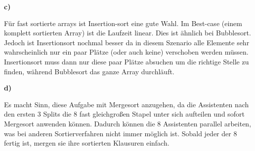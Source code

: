 \documentclass[a4paper,graphics,11pt]{article}
\begin{document}
\textbf{c)}

Für fast sortierte arrays ist Insertion-sort eine gute Wahl. Im Best-case (einem komplett sortierten Array)
ist die Laufzeit linear. Dies ist ähnlich bei Bubblesort. Jedoch ist Insertionsort nochmal besser da
in diesem Szenario alle Elemente sehr wahrscheinlich nur ein paar Plätze (oder auch keine) verschoben werden
müssen. Insertionsort muss dann nur diese paar Plätze absuchen um die richtige Stelle zu finden, während Bubblesort
das ganze Array durchläuft.

\textbf{d)}

Es macht Sinn, diese Aufgabe mit Mergesort anzugehen, da die Assistenten nach den ersten 3 Splits die 8 fast gleichgroßen
Stapel unter sich aufteilen und sofort Mergesort anwenden können. Dadurch können die 8 Assistenten parallel arbeiten,
was bei anderen Sortierverfahren nicht immer möglich ist. Sobald jeder der 8 fertig ist, mergen sie ihre sortierten Klausuren
einfach.
\end{document}
